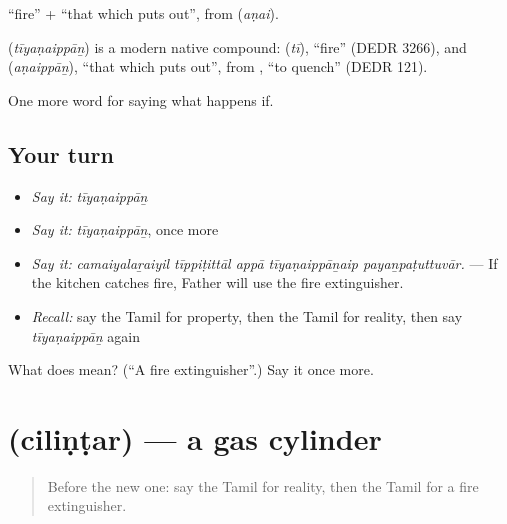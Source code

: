  \textquotedblleft{}fire\textquotedblright{} +  \textquotedblleft{}that which puts out\textquotedblright{}, from  (\emph{aṇai}).

\begin{cousinweb}
\textbf{} (\emph{tīyaṇaippāṉ}) is a modern native compound:  (\emph{tī}), \textquotedblleft{}fire\textquotedblright{} (DEDR 3266), and  (\emph{aṇaippāṉ}), \textquotedblleft{}that which puts out\textquotedblright{}, from , \textquotedblleft{}to quench\textquotedblright{} (DEDR 121).
\end{cousinweb}

\begin{grammarlens}[title={What you've built}]
One more word for saying what happens if.
\end{grammarlens}

\subsection*{Your turn}
\begin{itemize}
\raggedright
  \item \emph{Say it:} \emph{tīyaṇaippāṉ}
  \item \emph{Say it:} \emph{tīyaṇaippāṉ}, once more
  \item \emph{Say it:} \emph{camaiyalaṟaiyil tīppiṭittāl appā tīyaṇaippāṉaip payaṉpaṭuttuvār.} — If the kitchen catches fire, Father will use the fire extinguisher.
  \item \emph{Recall:} say the Tamil for property, then the Tamil for reality, then say \emph{tīyaṇaippāṉ} again
\end{itemize}

\begin{tcolorbox}[breakable,colback=teal!4,colframe=teal!35!black,title={Before you move on}]
What does  mean? (\textquotedblleft{}A fire extinguisher\textquotedblright{}.) Say it once more.
\end{tcolorbox}
\section[\texorpdfstring{\ta{சிலிண்டர்} (ciliṇṭar)}{சிலிண்டர் (ciliṇṭar)}]{ (ciliṇṭar) — a gas cylinder}

\label{lesson:TA-C552-cilintar}



\begin{quote}
Before the new one: say the Tamil for reality, then the Tamil for a fire extinguisher.
\end{quote}

